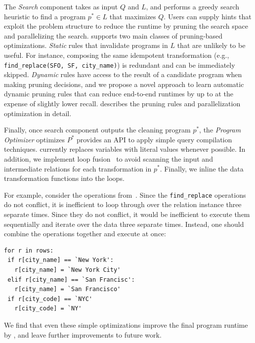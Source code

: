 The {\it Search} component takes as input $Q$ and $L$, and performs a greedy search heuristic to find a program $p^* \in L$ that maximizes $Q$.  Users can supply hints that exploit the problem structure to reduce the runtime by pruning the search space and parallelizing the search.  \sys supports two main classes of pruning-based optimizations. {\it Static} rules that invalidate programs in $L$ that are unlikely to be useful.  For instance, composing the same idempotent transformation (e.g., \texttt{find\_replace(SFO, SF, city\_name)}) is redundant and can be immediately skipped.  {\it Dynamic} rules have access to the result of a candidate program when making pruning decisions, and we propose a novel approach to learn automatic dynamic pruning rules that can reduce end-to-end runtimes by up to  at the expense of slightly lower recall.   describes the pruning rules and parallelization optimization in detail.


Finally, once search component outputs the cleaning program $p^*$, the {\it Program Optimizer} optimizes $P^*$ provides an API to apply simple query compilation techniques.  \sys currently replaces variables with literal values whenever possible.  In addition, we implement loop fusion~\cite{} to avoid scanning the input and intermediate relations for each transformation in $p^*$. Finally, we inline the data transformation functions into the loops.    

For example, consider the operations from~.  Since the \texttt{find\_replace} operations do not conflict, it is inefficient to loop through over the relation instance three separate times.  
Since they do not conflict, it would be inefficient to execute them sequentially and iterate over the data three separate times.
Instead, one should combine the operations together and execute at once:
\begin{lstlisting}
for r in rows:
 if r[city_name] == `New York':
   r[city_name] = `New York City'
 elif r[city_name] == `San Francisc':
   r[city_name] = `San Francisco'
 if r[city_code] == `NYC'
   r[city_code] = `NY'
\end{lstlisting}
We find that even these simple optimizations improve the final program runtime by , and leave further improvements to future work.




